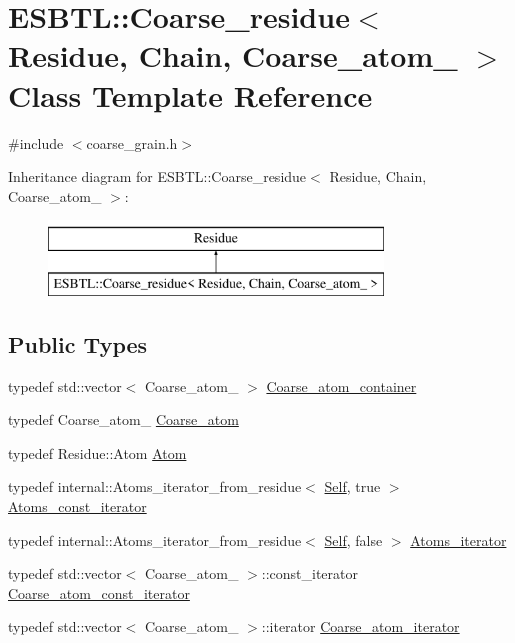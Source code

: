 \hypertarget{classESBTL_1_1Coarse__residue}{}\section{E\+S\+B\+TL\+:\+:Coarse\+\_\+residue$<$ Residue, Chain, Coarse\+\_\+atom\+\_\+ $>$ Class Template Reference}
\label{classESBTL_1_1Coarse__residue}


{\ttfamily \#include $<$coarse\+\_\+grain.\+h$>$}

Inheritance diagram for E\+S\+B\+TL\+:\+:Coarse\+\_\+residue$<$ Residue, Chain, Coarse\+\_\+atom\+\_\+ $>$\+:\begin{figure}[H]
\begin{center}
\leavevmode
\includegraphics[height=2.000000cm]{classESBTL_1_1Coarse__residue}
\end{center}
\end{figure}
\subsection*{Public Types}
\begin{DoxyCompactItemize}
\item 
typedef std\+::vector$<$ Coarse\+\_\+atom\+\_\+ $>$ \hyperlink{classESBTL_1_1Coarse__residue_ac1fa9270ab6914abefb8e63ceeb5ba1f}{Coarse\+\_\+atom\+\_\+container}
\item 
typedef Coarse\+\_\+atom\+\_\+ \hyperlink{classESBTL_1_1Coarse__residue_a4e83dc008345f6b828bcd3a67045a051}{Coarse\+\_\+atom}
\item 
typedef Residue\+::\+Atom \hyperlink{classESBTL_1_1Coarse__residue_a3b6c0c25f9f2e005ef2d5888073214f0}{Atom}
\item 
typedef internal\+::\+Atoms\+\_\+iterator\+\_\+from\+\_\+residue$<$ \hyperlink{classESBTL_1_1Coarse__residue}{Self}, true $>$ \hyperlink{group__grp__iters_gabb95e73700fd84dbde6e089927e03a6d}{Atoms\+\_\+const\+\_\+iterator}
\item 
typedef internal\+::\+Atoms\+\_\+iterator\+\_\+from\+\_\+residue$<$ \hyperlink{classESBTL_1_1Coarse__residue}{Self}, false $>$ \hyperlink{group__grp__iters_ga8081408a6d91ed2a777111e2b2651ad4}{Atoms\+\_\+iterator}
\item 
typedef std\+::vector$<$ Coarse\+\_\+atom\+\_\+ $>$\+::const\+\_\+iterator \hyperlink{group__grp__iters_ga5a4a865846cdde342538df7fc03c80ce}{Coarse\+\_\+atom\+\_\+const\+\_\+iterator}
\item 
typedef std\+::vector$<$ Coarse\+\_\+atom\+\_\+ $>$\+::iterator \hyperlink{group__grp__iters_ga09a38741d50d3b7296dae83eb0911e49}{Coarse\+\_\+atom\+\_\+iterator}
\end{DoxyCompactItemize}
